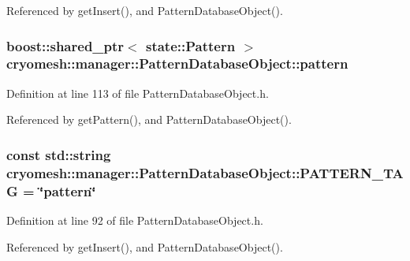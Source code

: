 \-Referenced by get\-Insert(), and \-Pattern\-Database\-Object().

\hypertarget{classcryomesh_1_1manager_1_1PatternDatabaseObject_a473ad5bb9f7b357f39337c1b8712ded6}{
\subsubsection[{pattern}]{\setlength{\rightskip}{0pt plus 5cm}boost\-::shared\-\_\-ptr$<$ {\bf state\-::\-Pattern} $>$ {\bf cryomesh\-::manager\-::\-Pattern\-Database\-Object\-::pattern}}}\label{classcryomesh_1_1manager_1_1PatternDatabaseObject_a473ad5bb9f7b357f39337c1b8712ded6}


\-Definition at line 113 of file \-Pattern\-Database\-Object.\-h.



\-Referenced by get\-Pattern(), and \-Pattern\-Database\-Object().

\hypertarget{classcryomesh_1_1manager_1_1PatternDatabaseObject_ab032a924bb375d4ee41fe8d854d7d9db}{
\subsubsection[{\-P\-A\-T\-T\-E\-R\-N\-\_\-\-T\-A\-G}]{\setlength{\rightskip}{0pt plus 5cm}const std\-::string {\bf cryomesh\-::manager\-::\-Pattern\-Database\-Object\-::\-P\-A\-T\-T\-E\-R\-N\-\_\-\-T\-A\-G} = \char`\"{}pattern\char`\"{}}}\label{classcryomesh_1_1manager_1_1PatternDatabaseObject_ab032a924bb375d4ee41fe8d854d7d9db}


\-Definition at line 92 of file \-Pattern\-Database\-Object.\-h.



\-Referenced by get\-Insert(), and \-Pattern\-Database\-Object().

